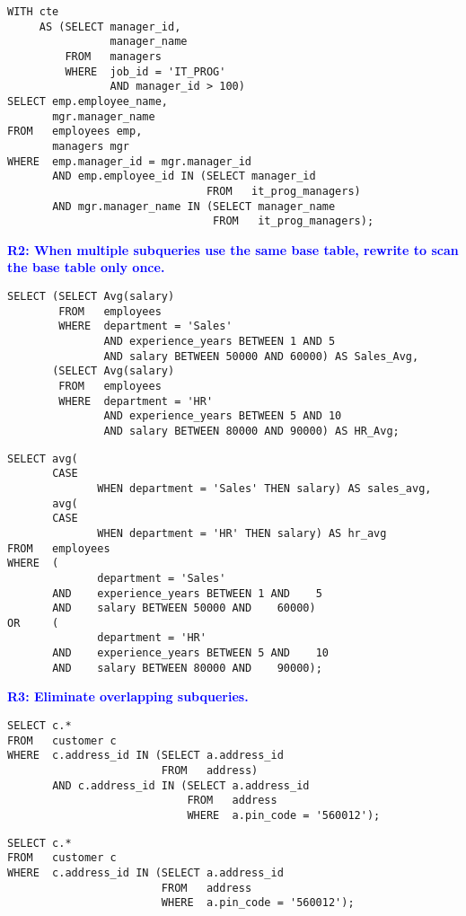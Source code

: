 \begin{flushleft}
{}

\begin{verbatim}
WITH cte
     AS (SELECT manager_id,
                manager_name
         FROM   managers
         WHERE  job_id = 'IT_PROG'
                AND manager_id > 100)
SELECT emp.employee_name,
       mgr.manager_name
FROM   employees emp,
       managers mgr
WHERE  emp.manager_id = mgr.manager_id
       AND emp.employee_id IN (SELECT manager_id
                               FROM   it_prog_managers)
       AND mgr.manager_name IN (SELECT manager_name
                                FROM   it_prog_managers); 
        \end{verbatim}

\newpage
\noindent \textcolor{blue}{\large \textbf{R2: When multiple subqueries use the same base table, rewrite to scan the base table only once.}}

\vspace{0.2in}
        \begin{verbatim}
SELECT (SELECT Avg(salary)
        FROM   employees
        WHERE  department = 'Sales'
               AND experience_years BETWEEN 1 AND 5
               AND salary BETWEEN 50000 AND 60000) AS Sales_Avg,
       (SELECT Avg(salary)
        FROM   employees
        WHERE  department = 'HR'
               AND experience_years BETWEEN 5 AND 10
               AND salary BETWEEN 80000 AND 90000) AS HR_Avg; \end{verbatim}
\vspace{0.2in}
\begin{verbatim}
SELECT avg(
       CASE
              WHEN department = 'Sales' THEN salary) AS sales_avg,
       avg(
       CASE
              WHEN department = 'HR' THEN salary) AS hr_avg
FROM   employees
WHERE  (
              department = 'Sales'
       AND    experience_years BETWEEN 1 AND    5
       AND    salary BETWEEN 50000 AND    60000)
OR     (
              department = 'HR'
       AND    experience_years BETWEEN 5 AND    10
       AND    salary BETWEEN 80000 AND    90000);
       \end{verbatim}

\newpage
\noindent \textcolor{blue}{\large \textbf{R3: Eliminate overlapping subqueries.}}

\vspace{0.2in}
        \begin{verbatim}
SELECT c.*
FROM   customer c
WHERE  c.address_id IN (SELECT a.address_id
                        FROM   address)
       AND c.address_id IN (SELECT a.address_id
                            FROM   address
                            WHERE  a.pin_code = '560012'); \end{verbatim}
\vspace{0.3in}
\begin{verbatim}
SELECT c.*
FROM   customer c
WHERE  c.address_id IN (SELECT a.address_id
                        FROM   address
                        WHERE  a.pin_code = '560012'); \end{verbatim}


\end{flushleft}
